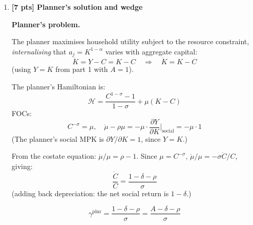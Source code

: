 \documentclass[a4paper,11pt]{article}
\begin{document}
\begin{enumerate}[label=\textbf{(\arabic*)},leftmargin=*]
\begin{answerbox}
Standard Euler equation (no-Ponzi condition holding):
\[
  \frac{\dot{c}}{c} = \frac{r - \rho}{\sigma}
\]

\textbf{Market interest rate.}

Firms hire capital at its private marginal product (net of depreciation):
\[
  r^{\mathrm{mkt}} = \alpha - \delta
\]
(from part 1: private MPK $= \alpha$, subtract $\delta$).

\textbf{Market BGP growth rate.}

On the BGP, $c$, $k$, $y$ all grow at the same constant rate $\gamma^{\mathrm{mkt}}$:
\[
  \boxed{\gamma^{\mathrm{mkt}} = \frac{\alpha - \delta - \rho}{\sigma}}
\]

\textbf{Existence condition.}

For $\gamma^{\mathrm{mkt}} > 0$ we need:
\[
  \alpha > \rho + \delta
\]
i.e.\ the private net return to capital must exceed the household's rate of time preference. Since $\alpha \in (0,1)$ is the private marginal product, this is the Arrow-model analogue of the Ramsey transversality condition binding with a positive growth rate.
\end{answerbox}

\bigskip

\item \textbf{[7 pts] Planner's solution and wedge}

\begin{answerbox}
\textbf{Planner's problem.}

The planner maximises household utility subject to the resource constraint, \emph{internalising} that $a_j = K^{1-\alpha}$ varies with aggregate capital:
\[
  \dot{K} = Y - C = K - C \quad\Longrightarrow\quad \dot{K} = K - C
\]
(using $Y = K$ from part 1 with $A=1$).

The planner's Hamiltonian is:
\[
  \mathcal{H} = \frac{C^{1-\sigma}-1}{1-\sigma} + \mu(K - C)
\]
FOCs:
\[
  C^{-\sigma} = \mu, \quad \dot{\mu} - \rho\mu = -\mu \cdot \frac{\partial Y}{\partial K}\bigg|_{\text{social}} = -\mu \cdot 1
\]
(The planner's social MPK is $\partial Y / \partial K = 1$, since $Y = K$.)

From the costate equation: $\dot{\mu}/\mu = \rho - 1$. Since $\mu = C^{-\sigma}$, $\dot{\mu}/\mu = -\sigma\dot{C}/C$, giving:
\[
  \frac{\dot{C}}{C} = \frac{1 - \delta - \rho}{\sigma}
\]
(adding back depreciation: the net social return is $1 - \delta$.)

\[
  \boxed{\gamma^{\mathrm{plnr}} = \frac{1 - \delta - \rho}{\sigma} = \frac{A - \delta - \rho}{\sigma}}
\]


\end{answerbox}
\end{enumerate}
\end{document}
